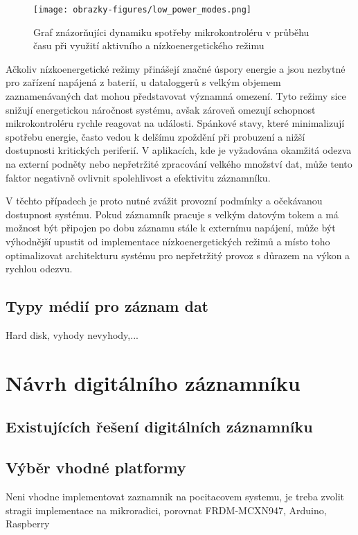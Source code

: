 \begin{figure}[h]
    \centering
    \texttt{[image: obrazky-figures/low\_power\_modes.png]}
    
    \caption{Graf znázorňujíci dynamiku spotřeby mikrokontroléru v průběhu času při využití aktivního a nízkoenergetického režimu}
    \label{fig:low-power-modes}
\end{figure}

Ačkoliv nízkoenergetické režimy přinášejí značné úspory energie a jsou nezbytné pro zařízení napájená z baterií, u dataloggerů s 
velkým objemem zaznamenávaných dat mohou představovat významná omezení. Tyto režimy sice snižují energetickou náročnost systému, 
avšak zároveň omezují schopnost mikrokontroléru rychle reagovat na události. Spánkové stavy, které minimalizují spotřebu energie, 
často vedou k delšímu zpoždění při probuzení a nižší dostupnosti kritických periferií. V aplikacích, kde je vyžadována okamžitá 
odezva na externí podněty nebo nepřetržité zpracování velkého množství dat, může tento faktor negativně ovlivnit spolehlivost a 
efektivitu záznamníku. \cite{embedded_low_power_modes}

V těchto případech je proto nutné zvážit provozní podmínky a očekávanou dostupnost systému. Pokud záznamník pracuje s velkým 
datovým tokem a má možnost být připojen po dobu záznamu stále k externímu napájení, může být výhodnější upustit od implementace 
nízkoenergetických režimů a místo toho optimalizovat architekturu systému pro nepřetržitý provoz s důrazem na výkon a rychlou 
odezvu. \cite{analog_devices_low_power_modes}

\section{Typy médií pro záznam dat}
Hard disk, vyhody nevyhody,...

\chapter{Návrh digitálního záznamníku}


\section{Existujících řešení digitálních záznamníku}


\section{Výběr vhodné platformy}
Neni vhodne implementovat zaznamnik na pocitacovem systemu, je treba zvolit stragii implementace na mikroradici, porovnat FRDM-MCXN947, Arduino, Raspberry

